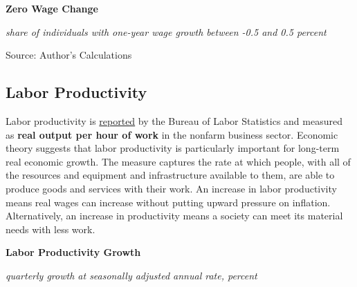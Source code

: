 \documentclass{report}
\makeatletter
\newcommand{\tbllink}[1]{\href{https://raw.githubusercontent.com/bdecon/US-chartbook/master/chartbook/data/#1}{\faTable}}
\newcommand*\short[1]{\expandafter\@gobbletwo\number\numexpr#1\relax}
\newcommand{\sbar}[4]{
		\addplot[ybar stacked, bar width=2.6pt, draw opacity=0, fill=#1] 
			table [x=#2, y=#3, col sep=comma]{#4};}
\newcommand{\dateaxisticks}{
		date coordinates in=x, axis line style={draw=none},
		xmax={2020-10-01},
		max space between ticks=40,	    
		xtick={{1990-01-01}, {1992-01-01}, {1994-01-01}, 
			{1996-01-01}, {1998-01-01}, {2000-01-01}, 
			{2002-01-01}, {2004-01-01}, {2006-01-01},
			{2008-01-01}, {2010-01-01}, {2012-01-01}, {2014-01-01},
		    {2016-01-01}, {2018-01-01}, {2020-01-01}},
		minor xtick={{1989-01-01}, {1991-01-01}, {1993-01-01},
			{1995-01-01}, {1997-01-01}, {1999-01-01}, 
			{2001-01-01}, {2003-01-01}, {2005-01-01}, {2007-01-01},
		    {2009-01-01}, {2011-01-01}, {2013-01-01}, {2015-01-01},
		    {2017-01-01}, {2019-01-01}},
		enlarge y limits={0.06}, enlarge x limits={0.01},
		}
\newcommand{\bbar}[2]{extra #1 ticks = {{#2}}, extra #1 tick labels = ,
		extra #1 tick style = {grid=major, grid style={thick, black!25}},}
\newcommand{\stdline}[4]{\addplot[very thick, no markers, color=#1] 
		table [x=#2, y=#3, col sep=comma] {#4};	}
\newcommand{\rbars}{
		\fill[color=black!10] (axis cs:{1990-07-01},\pgfkeysvalueof{/pgfplots/ymin}) rectangle 
			(axis cs:{1991-03-01}, \pgfkeysvalueof{/pgfplots/ymax});
		\fill[color=black!10] (axis cs:{2007-12-01},\pgfkeysvalueof{/pgfplots/ymin}) rectangle 
			(axis cs:{2009-07-01}, \pgfkeysvalueof{/pgfplots/ymax});
		\fill[color=black!10] (axis cs:{2001-03-01},\pgfkeysvalueof{/pgfplots/ymin}) rectangle 
			(axis cs:{2001-11-01}, \pgfkeysvalueof{/pgfplots/ymax});
		\fill[color=black!10] (axis cs:{2020-02-01},\pgfkeysvalueof{/pgfplots/ymin}) rectangle 
			(axis cs:{2020-10-01}, \pgfkeysvalueof{/pgfplots/ymax});}
\newcommand{\rebars}{
		\fill[color=black!10] (axis cs:{2007-12-01},\pgfkeysvalueof{/pgfplots/ymin}) rectangle 
			(axis cs:{2009-07-01}, \pgfkeysvalueof{/pgfplots/ymax});
		\fill[color=black!10] (axis cs:{2001-03-01},\pgfkeysvalueof{/pgfplots/ymin}) rectangle 
			(axis cs:{2001-11-01}, \pgfkeysvalueof{/pgfplots/ymax});
		\fill[color=black!10] (axis cs:{2020-02-01},\pgfkeysvalueof{/pgfplots/ymin}) rectangle 
			(axis cs:{2020-10-01}, \pgfkeysvalueof{/pgfplots/ymax});}
\makeatother
\begin{document}
{{{{{{{{{\begin{minipage}{0.76\textwidth}
\vspace{3mm}

\normalsize \textbf{Zero Wage Change}

\footnotesize{\textit{share of individuals with one-year wage growth between -0.5 and 0.5 percent}}

\hspace*{-2mm} 

\footnotesize{Source: Author's Calculations} \hspace{59mm} \tbllink{atl_wgt.csv}

\end{minipage}
\newpage
\begin{minipage}{0.76\textwidth}
\subsection*{\color{black!70} \seriffont Labor Productivity}
\small Labor productivity is \href{https://www.bls.gov/news.release/prod2.nr0.htm}{reported} by the Bureau of Labor Statistics and measured as \textbf{real output per hour of work} in the nonfarm business sector. Economic theory suggests that labor productivity is particularly important for long-term real economic growth. The measure captures the rate at which people, with all of the resources and equipment and infrastructure available to them, are able to produce goods and services with their work. An increase in labor productivity means real wages can increase without putting upward pressure on inflation. Alternatively, an increase in productivity means a society can meet its material needs with less work.\\


\vspace{5mm}

\normalsize \textbf{Labor Productivity Growth}

\footnotesize{\textit{quarterly growth at seasonally adjusted annual rate, percent}}

\hspace*{-2mm} 


\end{minipage}}}}}}}}}}
\end{document}
